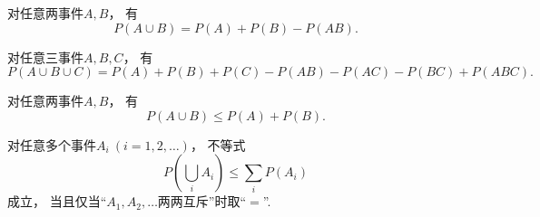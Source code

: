 \begin{theorem}[概率的加法]
对任意两事件\(A,B\)，
有\begin{equation}
	P(A \cup B) = P(A) + P(B) - P(AB).
\end{equation}
\end{theorem}

\begin{corollary}
对任意三事件\(A,B,C\)，
有\begin{equation}
	P(A \cup B \cup C)
	= P(A) + P(B) + P(C)
	- P(AB) - P(AC) - P(BC)
	+ P(ABC).
\end{equation}
\end{corollary}

\begin{theorem}
对任意两事件\(A,B\)，
有\begin{equation}
	P(A \cup B) \leq P(A) + P(B).
\end{equation}
\end{theorem}

\begin{corollary}[布尔不等式]
对任意多个事件\(A_i\ (i=1,2,\dotsc)\)，
不等式\begin{equation}\label{equation:概率论基础.布尔不等式}
	P\left(\bigcup_i A_i\right)
	\leq
	\sum_i P(A_i)
\end{equation}
成立，
当且仅当“\(A_1,A_2,\dotsc\)两两互斥”时取“\(=\)”.
\end{corollary}
